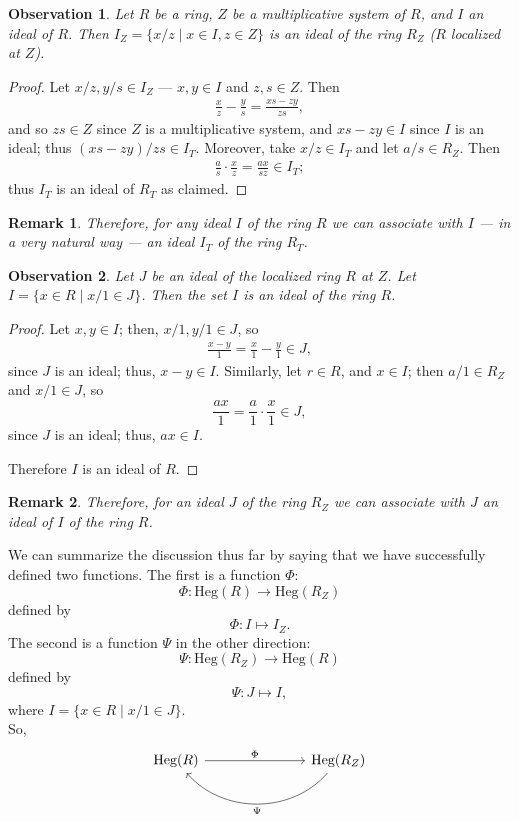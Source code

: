\documentclass[12pt,reqno]{amsart}
\theoremstyle{plain}
\newtheorem{obs}{Observation}
\newcommand{\heg}{\text{Heg}}
\newtheorem{rem}{Remark}
\begin{document}
\begin{obs} Let $R$ be a ring, $Z$ be a multiplicative system of $R$,  and $I$ an ideal of $R$. Then $I_Z = \{ x/z \mid x \in I, z \in Z \}$ is an ideal of the ring $R_Z$ ($R$ localized at $Z$).
\end{obs}
\begin{proof} Let $x/z, y/s \in I_Z$ — $x, y \in I$ and $z, s \in Z$.  Then 
\begin{align*}
\frac{x}{z} - \frac{y}{s} = \frac{xs-zy}{zs},
\end{align*}
and so $zs  \in Z$ since $Z$ is a multiplicative system, and $xs -zy \in I$ since $I$ is an ideal; thus $(xs-zy)/zs \in I_T$. Moreover, take $x/z \in I_T$ and let $a/s \in R_Z$. Then \begin{align*}
\frac{a}{s} \cdot \frac{x}{z} = \frac{ax}{sz}\in I_T;
\end{align*}
thus $I_T$ is an ideal of $R_T$ as claimed. 
\end{proof}

\begin{rem} Therefore, for any ideal $I$ of the ring $R$ we can associate with $I$ — in a very natural way — an ideal $I_T$ of the ring $R_T$.
\end{rem}

\begin{obs} Let $J$ be an ideal of the localized ring $R$ at $Z$.  Let $I = \{ x \in R \mid x/1 \in J \}$. Then the set $I$ is an ideal of the ring $R$. 
\end{obs}
\begin{proof} Let $x, y \in I$; then, $x/1, y/1 \in J$, so 
\begin{align*}
\frac{x-y}{1} = \frac{x}{1}- \frac{y}{1} \in J,
\end{align*}
since $J$ is an ideal; thus, $x-y \in I$. Similarly, let $r \in R$, and $x \in I$; then $a/1 \in R_Z$ and $x/1 \in J$, so 
\[
\frac{ax}{1} = \frac{a}{1} \cdot \frac{x}{1} \in J,
\]
since $J$ is an ideal; thus, $ax \in I$. 

Therefore $I$ is an ideal of $R$.
\end{proof}
\begin{rem} Therefore, for an ideal $J$ of the ring $R_Z$ we can associate with $J$ an ideal of $I$ of the ring $R$.
\end{rem}
We can summarize the discussion thus far by saying that we have successfully defined two functions. The first is a function $\Phi$:
\[ \Phi \colon \heg (R) \to \heg (R_Z)
\]
defined by 
\[
\Phi \colon I \mapsto I_Z.
\]
The second is a function $\Psi$ in the other direction:
\[
\Psi \colon \heg (R_Z) \to \heg (R)
\]
defined by 
\[
\Psi \colon J \mapsto I,
\]
where $I = \{ x \in R \mid x/1 \in J \}$.\\
So, 
\[
\begin{tikzcd}
\heg (R)  \arrow[rrr, "\Phi"] &  &  & \heg (R_Z) \arrow[lll, "\Psi", bend left=49]
\end{tikzcd}
\]
\end{document}
